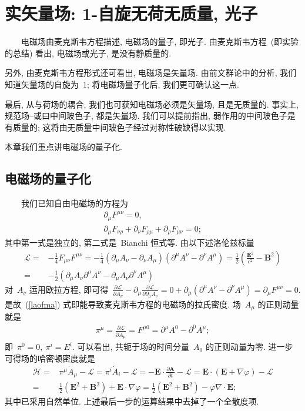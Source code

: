 

\section{实矢量场: 1-自旋无荷无质量, 光子}

~~~~电磁场由麦克斯韦方程描述, 电磁场的量子, 即光子. 由麦克斯韦方程~(即实验的总结) 看出, 电磁场或光子, 是没有静质量的.

另外, 由麦克斯韦方程形式还可看出, 电磁场是矢量场. 由前文群论中的分析, 我们知道矢量场的自旋为~1; 将电磁场量子化后, 我们更可确认这一点.

最后, 从与荷场的耦合, 我们也可获知电磁场必须是矢量场, 且是无质量的. 事实上, 规范场--或曰中间玻色子, 都是矢量场. 我们可以提前指出, 弱作用的中间玻色子是有质量的; 这将由无质量中间玻色子经过对称性破缺得以实现.

本章我们重点讲电磁场的量子化.

\subsection{电磁场的量子化}

~~~~我们已知自由电磁场的方程为
\begin{gather}
\partial_\mu F^{\mu\nu}=0,\\
\partial_\mu F_{\nu\rho}+\partial_\nu F_{\rho\mu}+\partial_\rho F_{\mu\nu}=0;
\end{gather}
其中第一式是独立的, 第二式是~Bianchi 恒式等. 由以下述洛伦兹标量
\begin{align}%
\mathcal{L}=&-\frac{1}{4}F_{\mu\nu}F^{\mu\nu}=-\frac{1}{4}(\partial_\mu A_\nu-\partial_\nu A_\mu)(\partial^\mu A^\nu-\partial^\nu A^\mu)=\frac{1}{2}(\frac{\bm{E}^2}{c^2}-\bm{B}^2)\nonumber\\
=&-\frac{1}{2}(\partial_\mu A_\nu\partial^\mu A^\nu-\partial_\mu A_\nu\partial^\nu A^\mu)\label{laofma}
\end{align}
对~$A_\nu$ 运用欧拉方程, 即可得~$\frac{\partial\mathcal{L}}{\partial A_\nu}-\partial_\mu\frac{\partial\mathcal{L}}{\partial\partial_\mu A_\nu}=0+\partial_\mu(\partial^\mu A^\nu-\partial^\nu A^\mu)=\partial_\mu F^{\mu\nu}=0$.
是故~(\ref{laofma}) 式即能导致麦克斯韦方程的电磁场的拉氏密度. 场~$A_\mu$ 的正则动量就是
\begin{align}
\pi^\mu=\frac{\partial\mathcal{L}}{\partial\dot{A}_\mu}=F^{\mu 0}=\partial^\mu A^0-\partial^0 A^\mu;
\end{align}
即~$\pi^0=0,~\pi^i=E^i$. 可以看出, 共轭于场的时间分量~$A_0$ 的正则动量为零. 进一步可得场的哈密顿密度就是
\begin{align}
\mathcal{H}=&\pi^\mu \dot{A}_\mu-\mathcal{L}=\pi^i \dot{A}_i-\mathcal{L}=-\bm{E}\cdot\frac{\partial\bm{A}}{\partial t}-\mathcal{L}=\bm{E}\cdot(\bm{E}+\nabla\varphi)-\mathcal{L}\nonumber\\
=&\frac{1}{2}(\bm{E}^2+\bm{B}^2)+\bm{E}\cdot\nabla\varphi=\frac{1}{2}(\bm{E}^2+\bm{B}^2)-\varphi\nabla\cdot\bm{E};
\end{align}
其中已采用自然单位. 上述最后一步的运算结果中去掉了一个全散度项.

